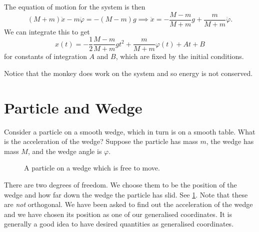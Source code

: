 \documentclass[fleqn]{NotesClass}
\begin{document}
    The equation of motion for the system is then
    \begin{equation}
        (M + m)\ddot{x} - m\ddot{\varphi} = -(M - m)g \implies \ddot{x} = -\frac{M - m}{M + m}g + \frac{m}{M + m}\ddot{\varphi}.
    \end{equation}
    We can integrate this to get
    \begin{equation}
        x(t) = -\frac{1}{2}\frac{M - m}{M + m}gt^2 + \frac{m}{M + m}\varphi(t) + At + B
    \end{equation}
    for constants of integration \(A\) and \(B\), which are fixed by the initial conditions.
    
    Notice that the monkey does work on the system and so energy is not conserved.
    
    \section{Particle and Wedge}
    Consider a particle on a smooth wedge, which in turn is on a smooth table.
    What is the acceleration of the wedge?
    Suppose the particle has mass \(m\), the wedge has mass \(M\), and the wedge angle is \(\varphi\).
    
    \begin{figure}
        \caption{A particle on a wedge which is free to move.}
        \label{fig:particle wedge}
    \end{figure}
    
    There are two degrees of freedom.
    We choose them to be the position of the wedge and how far down the wedge the particle has slid.
    See \cref{fig:particle wedge}.
    Note that these are \emph{not} orthogonal.
    We have been asked to find out the acceleration of the wedge and we have chosen its position as one of our generalised coordinates.
    It is generally a good idea to have desired quantities as generalised coordinates.
    
\end{document}

